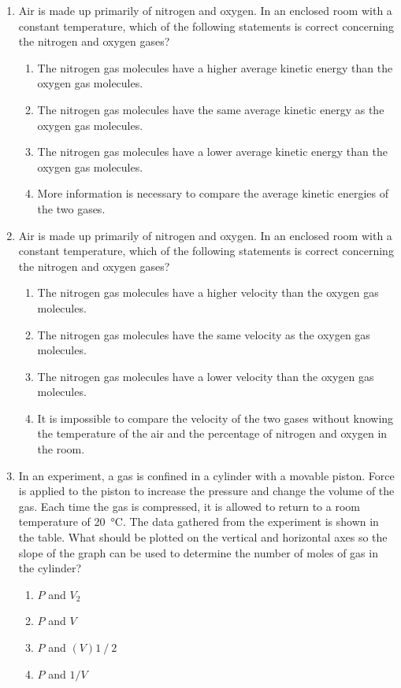 \documentclass{../../oss-apphys}
\begin{document}
\begin{multicols}{2}
\begin{enumerate}[leftmargin=18pt,start=3]
  \item Air is made up primarily of nitrogen and oxygen. In an enclosed room
    with a constant temperature, which of the following statements is
    correct concerning the nitrogen and oxygen gases?
    \begin{enumerate}[noitemsep,topsep=0pt,leftmargin=18pt,label=(\Alph*)]
    \item The nitrogen gas molecules have a higher average kinetic energy than
      the oxygen gas molecules.
    \item The nitrogen gas molecules have the same average kinetic energy as
      the oxygen gas molecules.
    \item The nitrogen gas molecules have a lower average kinetic energy than
      the oxygen gas molecules.
    \item More information is necessary to compare the average kinetic energies
      of the two gases.
    \end{enumerate}
    
  \item Air is made up primarily of nitrogen and oxygen. In an enclosed room
    with a constant temperature, which of the following statements is correct
    concerning the nitrogen and oxygen gases?
    \begin{enumerate}[noitemsep,topsep=0pt,leftmargin=18pt,label=(\Alph*)]
    \item The nitrogen gas molecules have a higher velocity than the oxygen gas
      molecules.
    \item The nitrogen gas molecules have the same velocity as the oxygen gas
      molecules.
    \item The nitrogen gas molecules have a lower velocity than the oxygen gas
      molecules.
    \item It is impossible to compare the velocity of the two gases without
      knowing the temperature of the air and the percentage of nitrogen and
      oxygen in the room.
    \end{enumerate}
  
  \item In an experiment, a gas is confined in a cylinder with a movable piston.
    Force is applied to the piston to increase the pressure and change the
    volume of the gas. Each time the gas is compressed, it is allowed to
    return to a room temperature of \SI{20}{\celsius}. The data gathered from
    the experiment is shown in the table. What should be plotted on the
    vertical and horizontal axes so the slope of the graph can be used to
    determine the number of moles of gas in the cylinder?
    \begin{enumerate}[noitemsep,topsep=0pt,leftmargin=18pt,label=(\Alph*)]
    \item $P$ and $V_2$
    \item $P$ and $V$
    \item $P$ and $(V) 1⁄2$
    \item $P$ and $1/V$
    \end{enumerate}


\end{enumerate}
\end{multicols}
\end{document}
